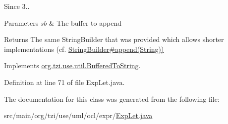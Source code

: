 \begin{DoxySince}{Since}
3.. 
\end{DoxySince}

\begin{DoxyParams}{Parameters}
{\em sb} & The buffer to append \\
\hline
\end{DoxyParams}
\begin{DoxyReturn}{Returns}
The same String\-Builder that was provided which allows shorter implementations (cf. \hyperlink{}{String\-Builder\#append(\-String))} 
\end{DoxyReturn}


Implements \hyperlink{interfaceorg_1_1tzi_1_1use_1_1util_1_1_buffered_to_string_aea95e4e53b18818d50ee253700e6e2d5}{org.\-tzi.\-use.\-util.\-Buffered\-To\-String}.



Definition at line 71 of file Exp\-Let.\-java.



The documentation for this class was generated from the following file\-:\begin{DoxyCompactItemize}
\item 
src/main/org/tzi/use/uml/ocl/expr/\hyperlink{_exp_let_8java}{Exp\-Let.\-java}\end{DoxyCompactItemize}
